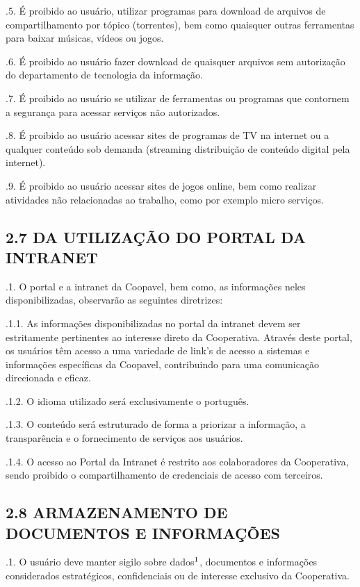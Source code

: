 \documentclass[letterpaper,10pt,brazil]{sphinxmanual}
\begin{document}
.5. É proibido ao usuário, utilizar programas para download de arquivos de compartilhamento por tópico (torrentes), bem como quaisquer outras ferramentas para baixar músicas, vídeos ou jogos.

.6. É proibido ao usuário fazer download de quaisquer arquivos sem autorização do departamento de tecnologia da informação.

.7. É proibido ao usuário se utilizar de ferramentas ou programas que contornem a segurança para acessar serviços não autorizados.

.8. É proibido ao usuário acessar sites de programas de TV na internet ou a qualquer conteúdo sob demanda (streaming \sphinxhyphen{} distribuição de conteúdo digital pela internet).

.9. É proibido ao usuário acessar sites de jogos online, bem como realizar atividades não relacionadas ao trabalho, como por exemplo micro serviços.


\subsection{2.7 DA UTILIZAÇÃO DO PORTAL DA INTRANET}
\label{\detokenize{regras:id7}}
.1. O portal e a intranet da Coopavel, bem como, as informações neles disponibilizadas, observarão as seguintes diretrizes:

.1.1. As informações disponibilizadas no portal da intranet devem ser estritamente pertinentes ao interesse direto da Cooperativa. Através deste portal, os usuários têm acesso a uma variedade de link’s de acesso a sistemas e informações específicas da Coopavel, contribuindo para uma comunicação direcionada e eficaz.

.1.2. O idioma utilizado será exclusivamente o português.

.1.3. O conteúdo será estruturado de forma a priorizar a informação, a transparência e o fornecimento de serviços aos usuários.

.1.4. O acesso ao Portal da Intranet é restrito aos colaboradores da Cooperativa, sendo proibido o compartilhamento de credenciais de acesso com terceiros.


\subsection{2.8 ARMAZENAMENTO DE DOCUMENTOS E INFORMAÇÕES}
\label{\detokenize{regras:id8}}
.1. O usuário deve manter sigilo sobre dados\(\sp{\text{1}}\), documentos e informações considerados estratégicos, confidenciais ou de interesse exclusivo da Cooperativa.
\end{document}
